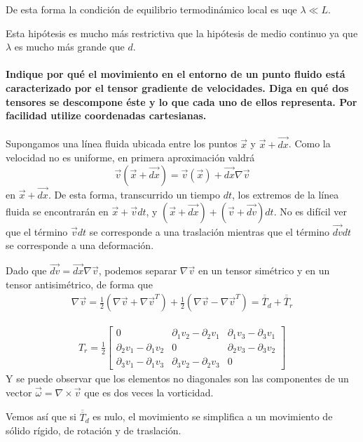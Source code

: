 \documentclass[a4paper]{article}
\begin{document}
De esta forma la condición de equilibrio termodinámico local es uqe $\lambda \ll L$.

Esta hipótesis es mucho más restrictiva que la hipótesis de medio 
continuo ya que $\lambda$ es mucho más grande que $d$.
\newpage
\paragraph{Indique por qué el movimiento en el entorno de un punto 
fluido está caracterizado por el tensor gradiente de velocidades.
Diga en qué dos tensores se descompone éste y lo que cada uno de ellos
representa. Por facilidad utilize coordenadas cartesianas.} 
Supongamos una línea fluida ubicada entre los puntos $\vec{x}$ y $\vec{x} + \vec{dx}$.
Como la velocidad no es uniforme, en primera aproximación valdrá 
$$\vec{v}(\vec{x}+\vec{dx}) = \vec{v}(\vec{x}) + \vec{dx} \nabla \vec{v}$$ en $\vec{x} + \vec{dx}$.
De esta forma, transcurrido un tiempo $dt$, los extremos de la línea
fluida se encontrarán en $\vec{x} + \vec{v}dt$, y $(\vec{x} + \vec{dx}) + (\vec{v} + \vec{dv})dt$.
No es difícil ver que el término $\vec{v}dt$ se corresponde a una traslación
mientras que el término $\vec{dv}dt$ se corresponde a una deformación.

Dado que $\vec{dv}= \vec{dx} \nabla \vec{v}$, podemos separar $\nabla \vec{v}$ 
en un tensor simétrico y en un tensor antisimétrico, de forma que 
\begin{align*}
	\nabla \vec{v} = \frac{1}{2} \left( \nabla \vec{v} + \nabla \vec{v} ^T \right)
	+ \frac{1}{2} \left(\nabla \vec{v} -\nabla \vec{v} ^T \right) =\overline{\overline {T}}_d +\overline{\overline {T}}_r
\end{align*}

\begin{align*}
	T_r = \frac{1}{2}\begin{bmatrix} 0 & \partial_1 v_2 - \partial_2 v_1& \partial_1 v_3 - \partial_3 v_1 \\
		\partial_2 v_1 - \partial_1 v_2 &
		0 &
		\partial_2 v_3 - \partial_3 v_2 \\
		\partial_3 v_1 - \partial_1 v_3&
		\partial_3 v_2 - \partial_2 v_3&
	0
	\end{bmatrix} 
\end{align*}
Y se puede observar que los elementos no diagonales son las componentes
de un vector $\vec{\omega} = \nabla \times \vec{v}  $ que es dos 
veces la vorticidad. 

Vemos así que si $\overline{\overline{T}}_d$ es nulo, el movimiento
se simplifica a un movimiento de sólido rígido, de rotación y de 
traslación.
\end{document}
